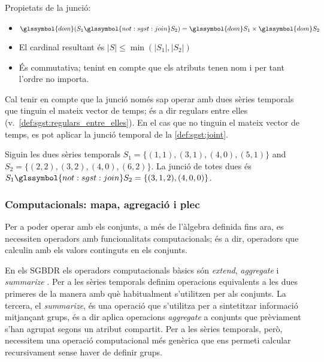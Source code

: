 Propietats de la junció:
\begin{itemize}
\item $\glssymbol{dom}(S_1 \glssymbol{not:sgst:join}
  S_2)=\glssymbol{dom}S_1 \times \glssymbol{dom}S_2$
\item El cardinal resultant és $|S|\leq\min(|S_1|,|S_2|)$
\item És commutativa; tenint en compte que els atributs tenen nom i
  per tant l'ordre no importa.
\end{itemize}


Cal tenir en compte que la junció només sap operar amb dues sèries
temporals que tinguin el mateix vector de temps; és a dir regulars
entre elles (v.\ \autoref{def:sgst:regulars_entre_elles}). En el cas
que no tinguin el mateix vector de temps, es pot aplicar la junció
temporal de la \autoref{def:sgst:joint}.



\begin{example}
  Siguin les dues sèries temporals $S_1=\{(1,1),(3,1),(4,0),(5,1)\}$
  and $S_2=\{(2,2),(3,2),(4,0),(6,2)\}$.  La junció de totes dues és
  $S_1 \glssymbol{not:sgst:join} S_2 = \{(3,1,2),(4,0,0)\}$.
\end{example}



\subsubsection{Computacionals: mapa, agregació i plec}

Per a poder operar amb els conjunts, a més de l'àlgebra definida fins
ara, es necessiten operadors amb funcionalitats computacionals; és a
dir, operadors que calculin amb els valors continguts en els conjunts. 

En els \gls{SGBDR} els operadors computacionals bàsics són
\emph{extend}, \emph{aggregate} i
\emph{summarize} \parencite[cap.~7]{date04:introduction8}.  Per a les
sèries temporals definim operacions equivalents a les dues primeres de
la manera amb què habitualment s'utilitzen per als conjunts.  La
tercera, el \emph{summarize}, és una operació que s'utilitza per a
sintetitzar informació mitjançant grups, és a dir aplica operacions
\emph{aggregate} a conjunts que prèviament s'han agrupat segons un
atribut compartit.  Per a les sèries temporals, però, necessitem una
operació computacional més genèrica que ens permeti calcular
recursivament sense haver de definir grups.


